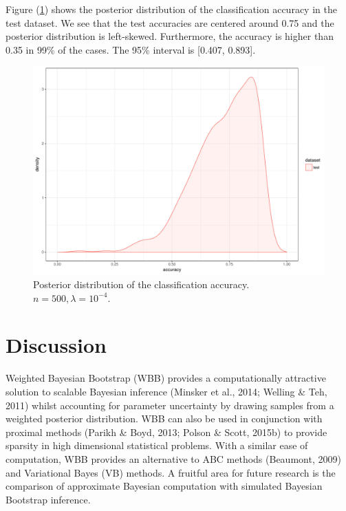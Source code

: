\documentclass[12pt]{TD-CJS}
\begin{document}
Figure (\ref{fig:acc}) shows the posterior distribution of the classification accuracy in the test dataset. We see that the test accuracies are centered around 0.75 and the posterior distribution is left-skewed. Furthermore, the accuracy is higher than 0.35 in 99\% of the cases. The 95\% interval is [0.407, 0.893].

\begin{figure}[!ht]
	\centering
	\includegraphics[width=0.7\linewidth]{acc}
	\caption{Posterior distribution of the classification accuracy. $n=500, \lambda=10^{-4}$.}
	\label{fig:acc}
\end{figure}



\section{Discussion}
Weighted Bayesian Bootstrap (WBB) provides a computationally attractive solution to scalable Bayesian inference (Minsker et al., 2014; Welling \& Teh, 2011)
whilst accounting for parameter uncertainty by drawing  samples from a weighted posterior distribution. WBB can also be used in conjunction with proximal methods (Parikh \& Boyd, 2013; Polson \& Scott, 2015b)
to provide  sparsity in high dimensional statistical problems. With a similar ease of computation, WBB provides an alternative to ABC methods (Beaumont, 2009) and Variational Bayes (VB) methods. A fruitful area for future research is the comparison of approximate Bayesian computation with simulated Bayesian Bootstrap inference.
\end{document}
